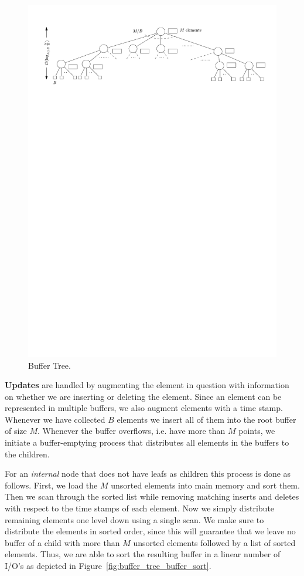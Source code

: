 \documentclass[twoside,11pt,openright]{report}
\begin{document}
\begin{figure}[h]
	\centering
	\includegraphics[width=1\textwidth]{../figures/buffer_tree}
	\caption{Buffer Tree.}
	\label{fig:buffer_tree}
\end{figure}

\textbf{Updates} are handled by augmenting the element in question with information on whether we are inserting or deleting the element. Since an element can be represented in multiple buffers, we also augment elements with a time stamp.
Whenever we have collected $B$ elements we insert all of them into the root buffer of size $M$. Whenever the buffer overflows, i.e. have more than $M$ points, we initiate a buffer-emptying process that distributes all elements in the buffers to the children.

For an \textit{internal} node that does not have leafs as children this process is done as follows. First, we load the $M$ unsorted elements into main memory and sort them. Then we scan through the sorted list while removing matching inserts and deletes with respect to the time stamps of each element. Now we simply distribute remaining elements one level down using a single scan. We make sure to distribute the elements in sorted order, since this will guarantee that we leave no buffer of a child with more than $M$ unsorted elements followed by a list of sorted elements. Thus, we are able to sort the resulting buffer in a linear number of I/O's as depicted in Figure~\ref{fig:buffer_tree_buffer_sort}.
\end{document}
